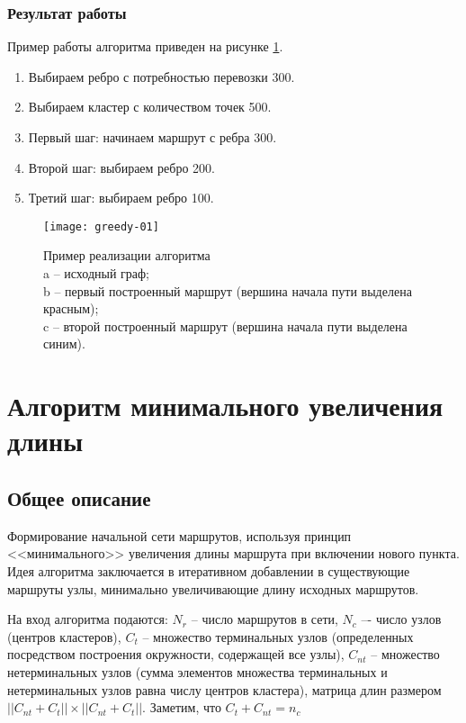 \subsubsection{Результат работы}
Пример работы алгоритма приведен на рисунке \ref{img:greedy-01}.
\begin{enumerate}
    \item Выбираем ребро с потребностью перевозки 300.
    \item Выбираем кластер с количеством точек 500.
    \item Первый шаг: начинаем маршрут с ребра 300.
    \item Второй шаг: выбираем ребро 200.
    \item Третий шаг: выбираем ребро 100.
\end{enumerate}

\begin{figure}[h!]
    \centering
    \texttt{[image: greedy-01]}
    \caption{Пример реализации алгоритма\\
        a -- исходный граф;\\
        b -- первый построенный маршрут (вершина начала пути выделена красным);\\
        c -- второй построенный маршрут (вершина начала пути выделена синим).
    }
   \label{img:greedy-01}
\end{figure}

\section{Алгоритм минимального увеличения длины}
\label{sec:second_alg}
\subsection{Общее описание}
Формирование начальной сети маршрутов, используя принцип <<минимального>> увеличения длины маршрута при 
включении нового пункта. Идея алгоритма заключается в итеративном добавлении в существующие маршруты узлы, 
минимально увеличивающие длину исходных маршрутов. 

На вход алгоритма подаются: \( N_r \) -- число маршрутов в сети, \( N_c \) –- число узлов 
(центров кластеров), \( C_t \) – множество терминальных узлов (определенных посредством построения 
окружности, содержащей все узлы), \( C_{nt} \) -- множество нетерминальных узлов (сумма элементов множества 
терминальных и нетерминальных узлов равна числу центров кластера), матрица длин размером 
\( ||{C_{nt}} + {C_{t}}|| \times ||{C_{nt}} + {C_{t}}|| \). Заметим, что \( C_t + C_{nt} = n_c \)

